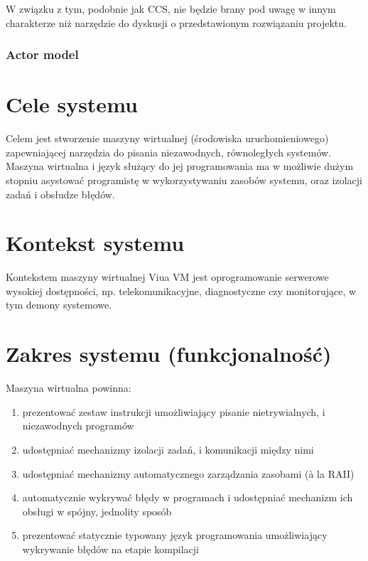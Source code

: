 \documentclass[11pt,oneside,a4paper,titlepage,onecolumn]{article}
\begin{document}
W związku z tym, podobnie jak CCS, nie będzie brany pod uwagę w innym charakterze niż narzędzie do
dyskusji o przedstawionym rozwiązaniu projektu.

\subsubsection{Actor model}


\section{Cele systemu}

Celem jest stworzenie maszyny wirtualnej (środowiska uruchomieniowego) zapewniającej narzędzia do
pisania niezawodnych, równoległych systemów. Maszyna wirtualna i język służący do jej programowania
ma w możliwie dużym stopniu asystować programistę w wykorzystywaniu zasobów systemu, oraz
izolacji zadań i obsłudze błędów.

\section{Kontekst systemu}

Kontekstem maszyny wirtualnej Viua VM jest oprogramowanie serwerowe wysokiej dostępności, np.
telekomunikacyjne, diagnostyczne czy monitorujące, w tym demony systemowe.

\section{Zakres systemu (funkcjonalność)}

Maszyna wirtualna powinna:

\begin{enumerate}
    \item prezentować zestaw instrukcji umożliwiający pisanie nietrywialnych, i niezawodnych programów
    \item udostępniać mechanizmy izolacji zadań, i komunikacji między nimi
    \item udostępniać mechanizmy automatycznego zarządzania zasobami (à la RAII)
    \item automatycznie wykrywać błędy w programach i udostępniać mechanizm ich obsługi w spójny, jednolity
        sposób
    \item prezentować statycznie typowany język programowania umożliwiający wykrywanie błędów na etapie
        kompilacji
\end{enumerate}
\end{document}
